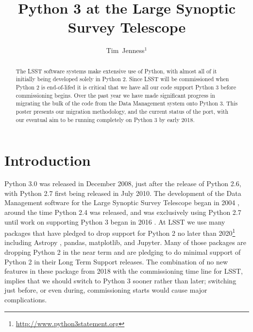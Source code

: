 \documentclass[11pt,twoside]{article}
\begin{document}
\title{Python 3 at the Large Synoptic Survey Telescope}

\author{Tim~Jenness$^1$
}


\begin{abstract}
  The LSST software systems make extensive use of Python, with almost all of it initially being developed solely in Python 2.
  Since LSST will be commissioned when Python 2 is end-of-lifed it is critical that we have all our code support Python 3 before commissioning begins.
  Over the past year we have made significant progress in migrating the bulk of the code from the Data Management system onto Python 3.
  This poster presents our migration methodology, and the current status of the port, with our eventual aim to be running completely on Python 3 by early 2018.
\end{abstract}

\section{Introduction}

Python 3.0 was released in December 2008, just after the release of Python 2.6, with Python 2.7 first being released in July 2010.
The development of the Data Management software for the Large Synoptic Survey Telescope began in 2004 \citep{2004AAS...20510811A}, around the time Python 2.4 was released, and was exclusively using Python 2.7 until work on supporting Python 3 began in 2016 \citep{P6-12_adassxxvi}.
At LSST we use many packages that have pledged to drop support for Python 2 no later than 2020\footnote{\url{http://www.python3statement.org}} including Astropy \citep{2013A&A...558A..33A}, pandas, matplotlib, and Jupyter.
Many of those packages are dropping Python 2 in the near term and are pledging to do minimal support of Python 2 in their Long Term Support releases.
The combination of no new features in these package from 2018 with the commissioning time line for LSST, implies that we should switch to Python 3 sooner rather than later; switching just before, or even during, commissioning starts would cause major complications.
\end{document}
